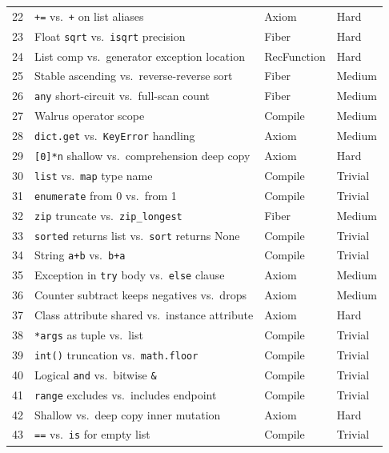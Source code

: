 \documentclass[11pt,a4paper]{report}
\theoremstyle{definition}
\theoremstyle{plain}
\begin{document}
\begin{center}
\begin{tabular}{r p{5cm} l l}
  22 & \texttt{+=} vs.\ \texttt{+} on list aliases &
       Axiom & Hard \\
  23 & Float \texttt{sqrt} vs.\ \texttt{isqrt} precision &
       Fiber & Hard \\
  24 & List comp vs.\ generator exception location &
       RecFunction & Hard \\
  25 & Stable ascending vs.\ reverse-reverse sort &
       Fiber & Medium \\
  26 & \texttt{any} short-circuit vs.\ full-scan count &
       Fiber & Medium \\
  27 & Walrus operator scope &
       Compile & Medium \\
  28 & \texttt{dict.get} vs.\ \texttt{KeyError} handling &
       Axiom & Medium \\
  29 & \texttt{[0]*n} shallow vs.\ comprehension deep copy &
       Axiom & Hard \\
  30 & \texttt{list} vs.\ \texttt{map} type name &
       Compile & Trivial \\
  31 & \texttt{enumerate} from 0 vs.\ from 1 &
       Compile & Trivial \\
  32 & \texttt{zip} truncate vs.\ \texttt{zip\_longest} &
       Fiber & Medium \\
  33 & \texttt{sorted} returns list vs.\ \texttt{sort} returns None &
       Compile & Trivial \\
  34 & String \texttt{a+b} vs.\ \texttt{b+a} &
       Compile & Trivial \\
  35 & Exception in \texttt{try} body vs.\ \texttt{else} clause &
       Axiom & Medium \\
  36 & Counter subtract keeps negatives vs.\ drops &
       Axiom & Medium \\
  37 & Class attribute shared vs.\ instance attribute &
       Axiom & Hard \\
  38 & \texttt{*args} as tuple vs.\ list &
       Compile & Trivial \\
  39 & \texttt{int()} truncation vs.\ \texttt{math.floor} &
       Compile & Trivial \\
  40 & Logical \texttt{and} vs.\ bitwise \texttt{\&} &
       Compile & Trivial \\
  41 & \texttt{range} excludes vs.\ includes endpoint &
       Compile & Trivial \\
  42 & Shallow vs.\ deep copy inner mutation &
       Axiom & Hard \\
  43 & \texttt{==} vs.\ \texttt{is} for empty list &
       Compile & Trivial \\

\end{tabular}
\end{center}
\end{document}

